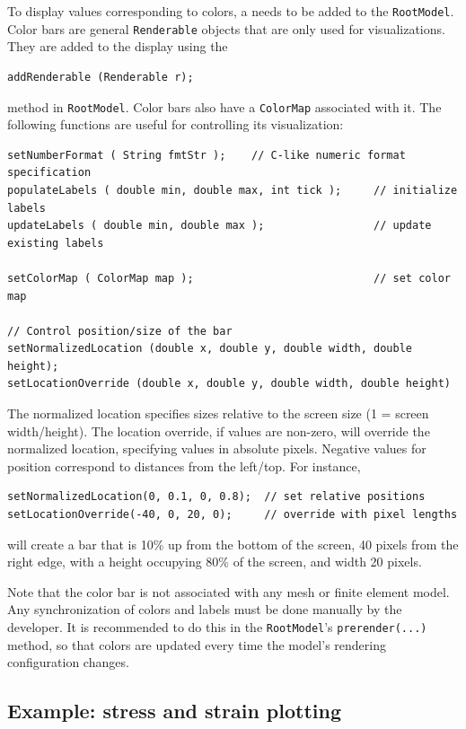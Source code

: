 To display values corresponding to colors, a 
 needs to be added to the 
{\tt RootModel}.  Color bars are general {\tt Renderable} objects that are
only used for visualizations.  They are added to the display using the
\begin{lstlisting}[]
addRenderable (Renderable r);
\end{lstlisting}
method in {\tt RootModel}.  Color bars also have a {\tt ColorMap} associated
with it.  The following functions are useful for controlling its visualization:
\begin{lstlisting}[]
setNumberFormat ( String fmtStr );    // C-like numeric format specification
populateLabels ( double min, double max, int tick );     // initialize labels
updateLabels ( double min, double max );                 // update existing labels

setColorMap ( ColorMap map );                            // set color map

// Control position/size of the bar
setNormalizedLocation (double x, double y, double width, double height);
setLocationOverride (double x, double y, double width, double height)
\end{lstlisting}
The normalized location specifies sizes relative to the screen size 
(1 = screen width/height).  The location override, if values are non-zero,
will override the normalized location, specifying values in absolute pixels.
Negative values for position correspond to distances from the left/top.
For instance,
\begin{lstlisting}[]
setNormalizedLocation(0, 0.1, 0, 0.8);  // set relative positions
setLocationOverride(-40, 0, 20, 0);     // override with pixel lengths
\end{lstlisting}
will create a bar that is 10\% up from the bottom of the screen, 40 pixels from
the right edge, with a height occupying 80\% of the screen, and width 20 pixels.

Note that the color bar is not associated with any mesh or finite element model.
Any synchronization of colors and labels must be done manually by the developer.
It is recommended to do this in the {\tt RootModel}'s {\tt prerender(...)} method,
so that colors are updated every time the model's rendering configuration changes.

\subsection{Example: stress and strain plotting}

